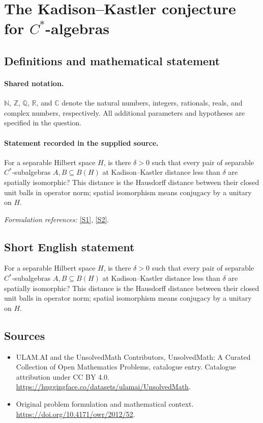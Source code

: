 \documentclass[11pt]{article}
\newcommand{\sref}[2]{\hyperlink{source:#1:#2}{[S#2]}}
\begin{document}
\section{\texorpdfstring{The Kadison–Kastler conjecture for $C^*$-algebras}{The Kadison–Kastler conjecture for C\textasciicircum{}*-algebras}}\label{statement}

\subsection{Definitions and mathematical statement}

\paragraph{Shared notation.}$\mathbb N$, $\mathbb Z$, $\mathbb Q$, $\mathbb R$, and $\mathbb C$ denote the natural numbers, integers, rationals, reals, and complex numbers, respectively. All additional parameters and hypotheses are specified in the question.


\paragraph{Statement recorded in the supplied source.}
For a separable Hilbert space $H$, is there $\delta>0$ such that every pair of separable $C^*$-subalgebras $A,B\subseteq B(H)$ at Kadison--Kastler distance less than $\delta$ are spatially isomorphic? This distance is the Hausdorff distance between their closed unit balls in operator norm; spatial isomorphism means conjugacy by a unitary on $H$.
\par\smallskip\textit{Formulation references:} \sref{statement}{1}, \sref{statement}{2}.
\subsection{Short English statement}
For a separable Hilbert space $H$, is there $\delta>0$ such that every pair of separable $C^*$-subalgebras $A,B\subseteq B(H)$ at Kadison--Kastler distance less than $\delta$ are spatially isomorphic? This distance is the Hausdorff distance between their closed unit balls in operator norm; spatial isomorphism means conjugacy by a unitary on $H$.
\subsection{Sources}
\begin{itemize}
\item[\hypertarget{source:statement:1}{S1}] ULAM.AI and the UnsolvedMath Contributors, UnsolvedMath: A Curated Collection of Open Mathematics Problems, catalogue entry. Catalogue attribution under CC BY 4.0.
\url{https://huggingface.co/datasets/ulamai/UnsolvedMath}.
\item[\hypertarget{source:statement:2}{S2}] Original problem formulation and mathematical context.
\url{https://doi.org/10.4171/owr/2012/52}.
\end{itemize}
\label{end:statement}
\end{document}
